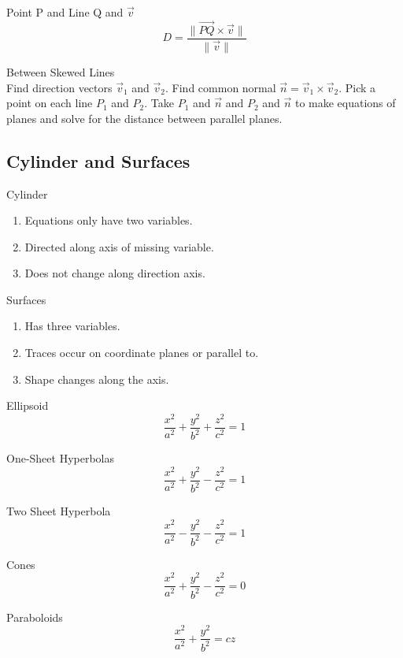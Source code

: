 \documentclass[12pt]{article}
\numberwithin{equation}{subsection}
\newcommand{\magp}[1]{\| #1 \|}
\begin{document}
\begin{flushleft}
Point P and Line Q and $\vec{v}$
\begin{equation}
D=\frac{\magp{\vec{PQ} \times \vec{v}}}{\magp{\vec{v}}}
\end{equation}

Between Skewed Lines\\
\bigskip
Find direction vectors $\vec{v}_{1}$ and $\vec{v}_{2}$. Find common normal $\vec{n}=\vec{v}_{1} \times \vec{v}_{2}$. Pick a point on each line $P_{1}$ and $P_{2}$. Take $P_{1}$ and $\vec{n}$ and $P_{2}$ and $\vec{n}$ to make equations of planes and solve for the distance between parallel planes. 
\newpage


\subsection{Cylinder and Surfaces}
Cylinder
\begin{enumerate}
\item Equations only have two variables.
\item Directed along axis of missing variable.
\item Does not change along direction axis.
\end{enumerate}


Surfaces
\begin{enumerate}
\item Has three variables.
\item Traces occur on coordinate planes or parallel to.
\item Shape changes along the axis.
\end{enumerate}
\bigskip

Ellipsoid
\begin{equation}
\frac{x^2}{a^2}+\frac{y^2}{b^2}+\frac{z^2}{c^2}=1
\end{equation}

One-Sheet Hyperbolas
\begin{equation}
\frac{x^2}{a^2}+\frac{y^2}{b^2}-\frac{z^2}{c^2}=1
\end{equation}

Two Sheet Hyperbola 
\begin{equation}
\frac{x^2}{a^2}-\frac{y^2}{b^2}-\frac{z^2}{c^2}=1
\end{equation}

Cones
\begin{equation}
\frac{x^2}{a^2}+\frac{y^2}{b^2}-\frac{z^2}{c^2}=0
\end{equation}

Paraboloids
\begin{equation}
\frac{x^2}{a^2}+\frac{y^2}{b^2}=cz
\end{equation}


\end{flushleft}
\end{document}

